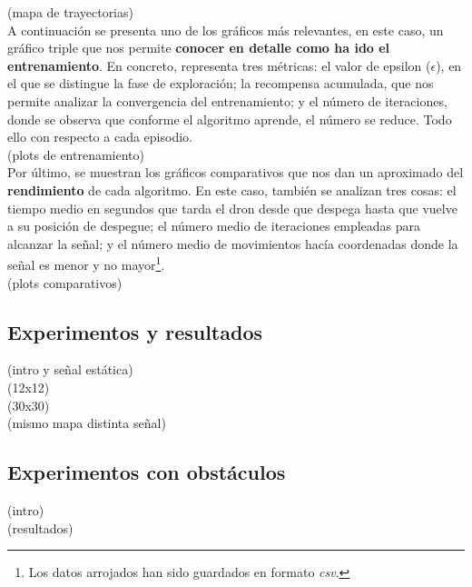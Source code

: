 (mapa de trayectorias)\\

A continuación se presenta uno de los gráficos más relevantes, en este caso, un gráfico triple que nos permite \textbf{conocer en detalle como ha ido el entrenamiento}. En concreto, representa tres métricas: el valor de epsilon ($\epsilon$), en el que se distingue la fase de exploración; la recompensa acumulada, que nos permite analizar la convergencia del entrenamiento; y el número de iteraciones, donde se observa que conforme el algoritmo aprende, el número se reduce. Todo ello con respecto a cada episodio.\\

(plots de entrenamiento)\\

Por último, se muestran los gráficos comparativos que nos dan un aproximado del \textbf{rendimiento} de cada algoritmo. En este caso, también se analizan tres cosas: el tiempo medio en segundos que tarda el dron desde que despega hasta que vuelve a su posición de despegue; el número medio de iteraciones empleadas para alcanzar la señal; y el número medio de movimientos hacía coordenadas donde la señal es menor y no mayor\footnote[4]{Los datos arrojados han sido guardados en formato \emph{csv}.}.\\

(plots comparativos)\\

\subsection{Experimentos y resultados}
\label{subsec:experimentos_resultados}

(intro y señal estática)\\

(12x12)\\

(30x30)\\

(mismo mapa distinta señal)\\

\subsection{Experimentos con obstáculos}
\label{subsec:experimentos_obstaculos}

(intro)\\

(resultados)\\


